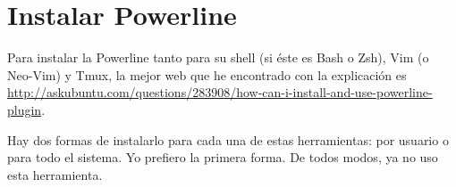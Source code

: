 \section{Instalar Powerline}\label{sec:pwline}
Para instalar la Powerline tanto para su shell (si éste es Bash o Zsh), Vim (o Neo-Vim) y Tmux, la mejor web que
he encontrado con la explicación es
\url{http://askubuntu.com/questions/283908/how-can-i-install-and-use-powerline-plugin}.

Hay dos formas de instalarlo para cada una de estas herramientas: por usuario o para todo el sistema. Yo
prefiero la primera forma. De todos modos, ya no uso esta herramienta.
